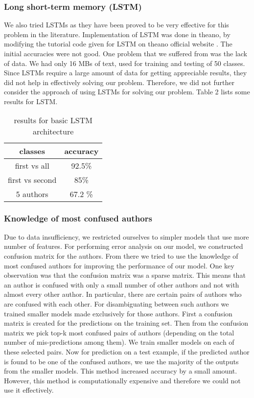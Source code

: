 \documentclass[letterpaper]{article}
\begin{document}
\subsubsection{Long short-term memory (LSTM)} 
We also tried LSTMs as they have been proved to be very effective for this problem in the literature. Implementation of LSTM was done in theano, by modifying the tutorial code given for LSTM on theano official website \cite{hochreiter1997long}. The initial accuracies were not good. One problem that we suffered from was the lack of data. We had only 16 MBs of text, used for training and testing of 50 classes. Since LSTMs require a large amount of data for getting appreciable results, they did not help in effectively solving our problem. Therefore, we did not further consider the approach of using LSTMs for solving our problem. Table 2 lists some results for LSTM.

\begin{table}[h!]
\centering
\begin{tabular}{||c | c||} 
 \hline
 classes & accuracy \\ [0.5ex] 
 \hline\hline
 first vs all & 92.5\%   \\
 \hline
 first vs second & 85\%   \\
 \hline
 5 authors  & 67.2 \% \\
 \hline
\end{tabular}
\caption{ results for basic LSTM architecture }
\label{table:1}
\end{table}



\subsubsection{Knowledge of most confused authors}
Due to data insufficiency, we restricted ourselves to simpler models that use more number of features. For performing error analysis on our model, we constructed confusion matrix for the authors. From there we tried to use the knowledge of most confused authors for improving the performance of our model. One key observation was that the confusion matrix was a sparse matrix. This means that an author is confused with only a small number of other authors and not with almost every other author. In particular, there are certain pairs of authors who are confused with each other. For disambiguating between such authors we trained smaller models made exclusively for those authors. First a confusion matrix is created for the predictions on the training set. Then from the confusion matrix we pick top-k most confused pairs of authors (depending on the total number of mis-predictions among them). We train smaller models on each of these selected pairs. Now for prediction on a test example, if the predicted author is found to be one of the confused authors, we use the majority of the outputs from the smaller models. This method increased accuracy by a small amount. However, this method is computationally expensive and therefore we could not use it effectively.
\end{document}
